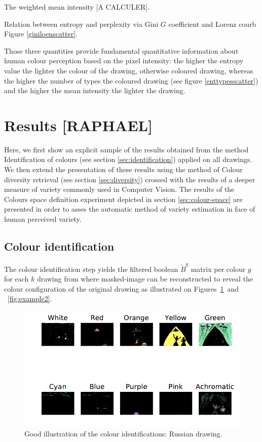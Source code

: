 \documentclass[11pt,a4paper]{article}
\begin{document}
The weighted mean intensity {[}A CALCULER{]}.

Relation between entropy and perplexity via Gini \(G\) coefficient and
Lorenz courb Figure \ref{giniloenscatter}.

Those three quantities provide fundamental quantitative information
about human colour perception based on the pixel intensity: the higher
the entropy value the lighter the colour of the drawing, otherwise
coloured drawing, whereas the higher the number of types the coloured
drawing (see figure \ref{enttypesscatter}) and the higher the mean
intensity the lighter the drawing.



\section{Results [RAPHAEL]}
Here, we first show an explicit sample of the results obtained from the method Identification of colours (see section \ref{sec:identification}) applied on all drawings. 
We then extend the presentation of these results using the method of Colour diversity retrieval (see section \ref{sec:diversity}) crossed with the results of a deeper measure of variety commonly used in Computer Vision. 
The results of the Colours space definition experiment depicted in section \ref{sec:colour-space} are presented in order to asses the automatic method of variety estimation in face of human perceived variety.

\subsection{Colour identification}
 \label{sec:results_identification}
The colour identification step yields the filtered boolean $\tilde{B}^g$ matrix per colour $g$ for each $k$ drawing from where masked-image can be reconstructed to reveal the colour configuration of the original drawing as illustrated on Figures~\ref{fig:example1}~and ~\ref{fig:example2}.

\begin{figure}[!h]
	\centering
	\includegraphics[width=0.62\linewidth]{figures/ru08_bo_f_pb_07_05_ali-rno_filter_mask.pdf}\hfil
	\caption{Good illustration of the colour identifications: Russian drawing.}
	\label{fig:example1}
\end{figure}
\end{document}
